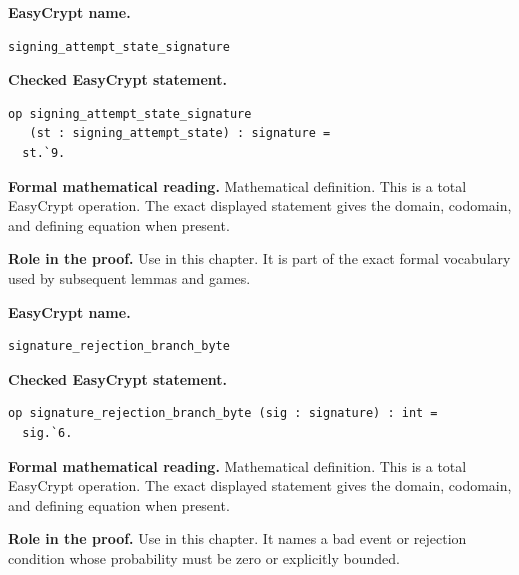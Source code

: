 \begin{formaldefinition}
\noindent\textbf{EasyCrypt name.}
\begin{lstlisting}[language=EasyCrypt,basicstyle=\ttfamily\scriptsize]
signing_attempt_state_signature
\end{lstlisting}
\noindent\textbf{Checked EasyCrypt statement.}
\begin{lstlisting}[language=EasyCrypt,basicstyle=\ttfamily\scriptsize]
op signing_attempt_state_signature
   (st : signing_attempt_state) : signature =
  st.`9.
\end{lstlisting}
\noindent\textbf{Formal mathematical reading.}
Mathematical definition. This is a total EasyCrypt operation.  The exact displayed statement gives the domain, codomain, and defining equation when present.

\noindent\textbf{Role in the proof.}
Use in this chapter. It is part of the exact formal vocabulary used by subsequent lemmas and games.

\end{formaldefinition}

\begin{formaldefinition}
\noindent\textbf{EasyCrypt name.}
\begin{lstlisting}[language=EasyCrypt,basicstyle=\ttfamily\scriptsize]
signature_rejection_branch_byte
\end{lstlisting}
\noindent\textbf{Checked EasyCrypt statement.}
\begin{lstlisting}[language=EasyCrypt,basicstyle=\ttfamily\scriptsize]
op signature_rejection_branch_byte (sig : signature) : int =
  sig.`6.
\end{lstlisting}
\noindent\textbf{Formal mathematical reading.}
Mathematical definition. This is a total EasyCrypt operation.  The exact displayed statement gives the domain, codomain, and defining equation when present.

\noindent\textbf{Role in the proof.}
Use in this chapter. It names a bad event or rejection condition whose probability must be zero or explicitly bounded.

\end{formaldefinition}

